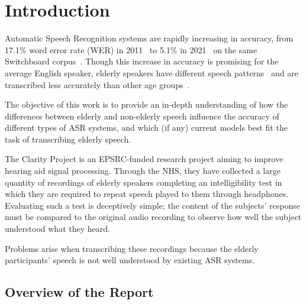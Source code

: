 \chapter{Introduction}\label{ch:introduction}

Automatic Speech Recognition systems are rapidly increasing in accuracy, from 17.1\% word error
rate (WER) in 2011~\cite{seide2011} to 5.1\% in 2021~\cite{Ng2021} on the same Switchboard
corpus~\cite{switchboard}.
Though this increase in accuracy is promising for the average English speaker, elderly speakers
have different speech patterns~\cite{Horton2010} and are transcribed less accurately than other age
groups~\cite{picone1990}.

The objective of this work is to provide an in-depth understanding of how the differences
between elderly and non-elderly speech influence the accuracy of different types of ASR systems,
and which (if any) current models best fit the task of transcribing elderly speech.

The Clarity Project is an EPSRC-funded research project aiming to improve hearing aid signal
processing.
Through the NHS, they have collected a large quantity of recordings of elderly speakers
completing an intelligibility test in which they are required to repeat speech played to them
through headphones.
Evaluating such a test is deceptively simple;
the content of the subjects' response must be compared to the original audio recording to observe
how well the subject understood what they heard.

Problems arise when transcribing these recordings because the elderly participants' speech is not
well understood by existing ASR systems.

\section{Overview of the Report}\label{sec:overview-of-the-report}

